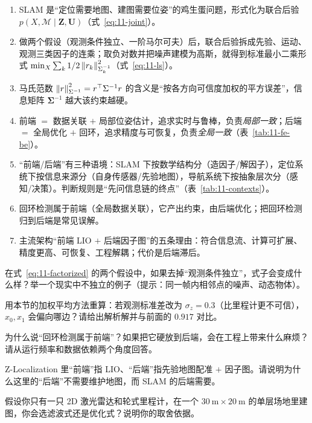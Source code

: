 \begin{summary}
\begin{enumerate}
  \item SLAM 是``定位需要地图、建图需要位姿''的鸡生蛋问题，形式化为联合后验 $p(X,\mathcal{M}\mid\bm{Z},\bm{U})$（式~\eqref{eq:11-joint}）。
  \item 做两个假设（观测条件独立、一阶马尔可夫）后，联合后验拆成先验、运动、观测三类因子的连乘；取负对数并把噪声建模为高斯，就得到标准最小二乘形式 $\min_X\sum_k1/2\left\lVert r_k \right\rVert_{\Sigma_k^{-1}}^2$（式~\eqref{eq:11-ls}）。
  \item 马氏范数 $\left\lVert r \right\rVert^2_{\Sigma^{-1}}=r^{\top}\Sigma^{-1}r$ 的含义是``按各方向可信度加权的平方误差''，信息矩阵 $\bm{\Sigma}^{-1}$ 越大该约束越硬。
  \item 前端 $=$ 数据关联 $+$ 局部位姿估计，追求实时与鲁棒，负责\emph{局部一致}；后端 $=$ 全局优化 $+$ 回环，追求精度与可恢复，负责\emph{全局一致}（表~\ref{tab:11-fe-be}）。
  \item ``前端/后端''有三种语境：SLAM 下按数学结构分（造因子/解因子），定位系统下按信息来源分（自身传感器/先验地图），导航系统下按抽象层次分（感知/决策）。判断规则是``先问信息链的终点''（表~\ref{tab:11-contexts}）。
  \item 回环检测属于前端（全局数据关联），它产出约束，由后端优化；把回环检测归到后端是常见误解。
  \item 主流架构``前端 LIO $+$ 后端因子图''的五条理由：符合信息流、计算可扩展、精度更高、可恢复、工程解耦；代价是后端滞后。
\end{enumerate}


\end{summary}

\begin{problemset}
  \item 在式~\eqref{eq:11-factorized} 的两个假设中，如果去掉``观测条件独立''，式子会变成什么样？举一个现实中不独立的例子（提示：同一帧内相邻点的噪声、动态物体）。
  \item 用本节的加权平均方法重算：若观测标准差改为 $\sigma_z=0.3$（比里程计更不可信），$x_0,x_1$ 会偏向哪边？请给出解析解并与前面的 $0.917$ 对比。
  \item 为什么说``回环检测属于前端''？如果把它硬放到后端，会在工程上带来什么麻烦？请从运行频率和数据依赖两个角度回答。
  \item Z-Localization 里``前端''指 LIO、``后端''指先验地图配准 $+$ 因子图。请说明为什么这里的``后端''不需要维护地图，而 SLAM 的后端需要。
  \item 假设你只有一只 2D 激光雷达和轮式里程计，在一个 $30\ \mathrm{m}\times20\ \mathrm{m}$ 的单层场地里建图，你会选滤波式还是优化式？说明你的取舍依据。
\end{problemset}

